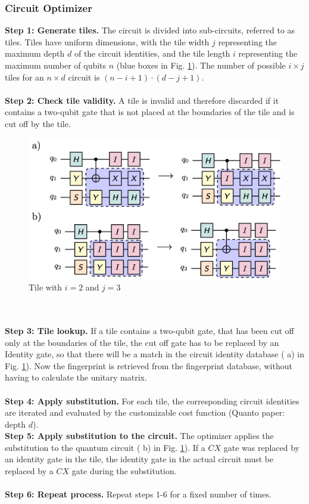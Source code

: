 \subsubsection{Circuit Optimizer}
\label{opt}
\textbf{Step 1: Generate tiles.}
The circuit is divided into sub-circuits, referred to as tiles. Tiles have uniform dimensions, with the tile width $j$ representing the maximum depth $d$ of the circuit identities, and the tile length $i$ representing the maximum number of qubits $n$ (blue boxes in Fig. \ref{fig:quanto_tile}). The number of possible $i \times j$ tiles for an $n \times d$ circuit is $(n-i+1) \cdot (d-j+1)$.
\\\\
\textbf{Step 2: Check tile validity.}
A tile is invalid and therefore discarded if it contains a two-qubit gate that is not placed at the boundaries of the tile and is cut off by the tile.
\begin{figure}
  \includegraphics[width=1\columnwidth]{assets/quanto_tile2.png}
  \caption{Tile with $i=2$ and $j=3$}
  \label{fig:quanto_tile}
\end{figure}
\\\\
\textbf{Step 3: Tile lookup.}
If a tile contains a two-qubit gate, that has been cut off only at the boundaries of the tile, the cut off gate has to be replaced by an Identity gate, so that there will be a match in the circuit identity database ( a) in Fig. \ref{fig:quanto_tile}). Now the fingerprint is retrieved from the fingerprint database, without having to calculate the unitary matrix. 
\\\\
\textbf{Step 4: Apply substitution.}
For each tile, the corresponding circuit identities are iterated and evaluated by the customizable cost function (Quanto paper: depth $d$).
\\
\textbf{Step 5: Apply substitution to the circuit.}
The optimizer applies the substitution to the quantum circuit ( b) in Fig. \ref{fig:quanto_tile}). If a $CX$ gate was replaced by an identity gate in the tile, the identity gate in the actual circuit must be replaced by a $CX$ gate during the substitution. 
\\\\
\textbf{Step 6: Repeat process.}
Repeat steps 1-6 for a fixed number of times.

